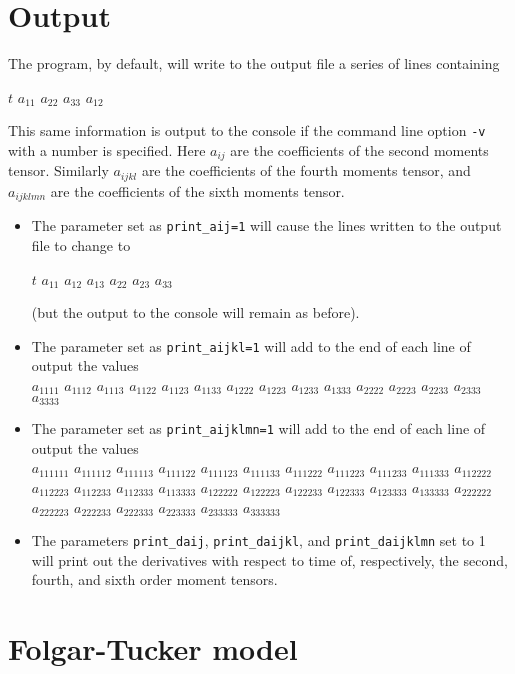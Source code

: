 \documentclass{amsart}
\begin{document}
\section*{Output}

\noindent
The program, by default, will write to the output file a series of lines containing
\begin{center}$t$ $a_{11}$ $a_{22}$ $a_{33}$ $a_{12}$\end{center}
This same information is output to the console if the command line option {\tt -v} with a number is specified.  Here $a_{ij}$ are the coefficients of the second moments tensor.  Similarly $a_{ijkl}$ are the coefficients of the fourth moments tensor, and $a_{ijklmn}$ are the coefficients of the sixth moments tensor.
\begin{itemize}
\item The parameter set as {\tt print\_aij=1} will cause the lines written to the output file to change to
\begin{center}$t$ $a_{11}$ $a_{12}$ $a_{13}$ $a_{22}$ $a_{23}$ $a_{33}$\end{center}
(but the output to the console will remain as before).
\item The parameter set as {\tt print\_aijkl=1} will add to the end of each line of output the values\\
$a_{1111}$ $a_{1112}$ $a_{1113}$ $a_{1122}$ $a_{1123}$ $a_{1133}$ $a_{1222}$ $a_{1223}$ $a_{1233}$ $a_{1333}$ $a_{2222}$ $a_{2223}$ $a_{2233}$ $a_{2333}$ $a_{3333}$
\item The parameter set as {\tt print\_aijklmn=1} will add to the end of each line of output the values\\
$a_{111111}$ $a_{111112}$ $a_{111113}$ $a_{111122}$ $a_{111123}$ $a_{111133}$ $a_{111222}$ $a_{111223}$ $a_{111233}$ $a_{111333}$ $a_{112222}$ $a_{112223}$ $a_{112233}$ $a_{112333}$ $a_{113333}$ $a_{122222}$ $a_{122223}$ $a_{122233}$ $a_{122333}$ $a_{123333}$ $a_{133333}$ $a_{222222}$ $a_{222223}$ $a_{222233}$ $a_{222333}$ $a_{223333}$ $a_{233333}$ $a_{333333}$
\item The parameters {\tt print\_daij}, {\tt print\_daijkl}, and {\tt print\_daijklmn} set to 1 will print out the derivatives with respect to time of, respectively, the second, fourth, and sixth order moment tensors.
\end{itemize}

\section*{Folgar-Tucker model}
\end{document}
